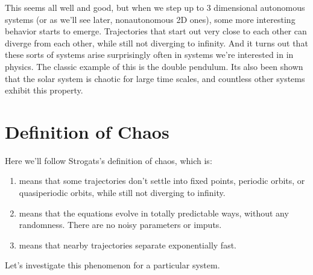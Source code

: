 \documentclass[letterpaper,10pt,english]{jupyterBook}
\begin{document}
\sphinxAtStartPar
This seems all well and good, but when we step up to 3 dimensional autonomous systems (or as we’ll see later, non\sphinxhyphen{}autonomous 2D ones), some more interesting behavior starts to emerge. Trajectories that start out very close to each other can diverge from each other, while still not diverging to infinity. And it turns out that these sorts of  systems arise surprisingly often in systems we’re interested in in physics. The classic example of this is the double pendulum. Its also been shown that the solar system is chaotic for large time scales, and countless other systems exhibit this property.


\section{Definition of Chaos}
\label{\detokenize{content/1_mechanics/CHAOS:definition-of-chaos}}
\sphinxAtStartPar
Here we’ll follow Strogats’s definition of chaos, which is:

\sphinxAtStartPar
{} 
\begin{enumerate}
%
\item {} 
\sphinxAtStartPar
{} means that some trajectories don’t settle into fixed points, periodic orbits, or quasi\sphinxhyphen{}periodic orbits, while still not diverging to infinity.

\item {} 
\sphinxAtStartPar
{} means that the equations evolve in totally predictable ways, without any randomness. There are no noisy parameters or imputs.

\item {} 
\sphinxAtStartPar
{} means that nearby trajectories separate exponentially fast.

\end{enumerate}

\sphinxAtStartPar
Let’s investigate this phenomenon for a particular system.
\end{document}

